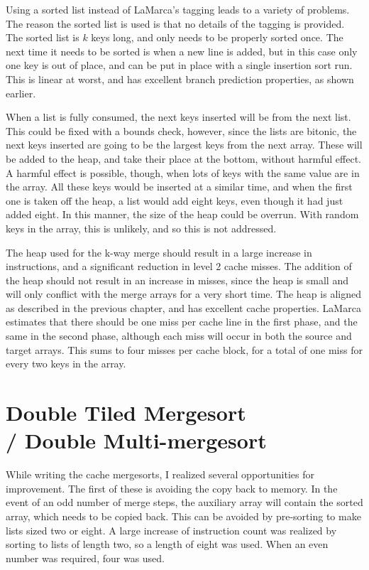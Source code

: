 Using a sorted list instead of LaMarca's tagging leads to a variety of problems.
The reason the sorted list is used is that no details of the tagging is
provided. The sorted list is $k$ keys long, and only needs to be properly sorted
once. The next time it needs to be sorted is when a new line is added, but in
this case only one key is out of place, and can be put in place with a single
insertion sort run. This is linear at worst, and has excellent branch prediction
properties, as shown earlier.

When a list is fully consumed, the next keys inserted will be from the next
list. This could be fixed with a bounds check, however, since the lists are
bitonic, the next keys inserted are going to be the largest keys from the next
array. These will be added to the heap, and take their place at the bottom,
without harmful effect. A harmful effect is possible, though, when lots of keys 
with the same value are in the array. All these keys would be inserted at a
similar time, and when the first one is taken off the heap, a list would add
eight keys, even though it had just added eight. In this manner, the size of the
heap could be overrun. With random keys in the array, this is unlikely, and so
this is not addressed.

The heap used for the k-way merge should result in a large increase in
instructions, and a significant reduction in level 2 cache misses. The addition
of the heap should not result in an increase in misses, since the heap is small
and will only conflict with the merge arrays for a very short time. The heap is
aligned as described in the previous chapter, and has excellent cache
properties. LaMarca estimates that there should be one miss per cache line
in the first phase, and the same in the second phase, although each miss will
occur in both the source and target arrays. This sums to four misses per cache
block, for a total of one miss for every two keys in the array.

\section{Double Tiled Mergesort \\/ Double Multi-mergesort}

While writing the cache mergesorts, I realized several opportunities for
improvement. The first of these is avoiding the copy back to memory. In the
event of an odd number of merge steps, the auxiliary array will contain the
sorted array, which needs to be copied back. This can be avoided by pre-sorting
to make lists sized two or eight. A large increase of instruction count was realized by
sorting to lists of length two, so a length of eight was used. When an even number
was required, four was used.

